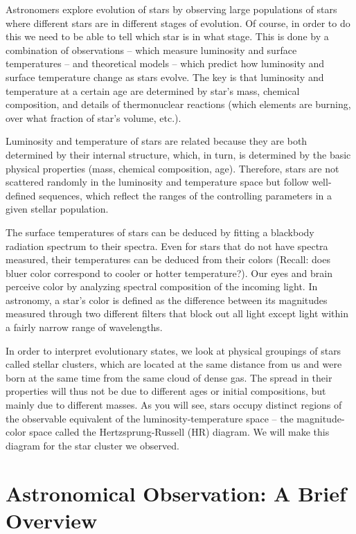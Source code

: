 Astronomers explore evolution of stars by observing large populations of stars where different stars are in different stages of evolution. Of course, in order to do this we need to be able to tell which star is in what stage. This is done by a combination of observations – which measure luminosity and surface temperatures – and theoretical models – which predict how luminosity and surface temperature change as stars evolve. The key is that luminosity and temperature at a certain age are determined by star's mass, chemical composition, and details of thermonuclear reactions (which elements are burning, over what fraction of star's volume, etc.).

Luminosity and temperature of stars are related because they are both determined by their internal structure, which, in turn, is determined by the basic physical properties (mass, chemical composition, age). Therefore, stars are not scattered randomly in the luminosity and temperature space but follow well-defined sequences, which reflect the ranges of the controlling parameters in a given stellar population. 

The surface temperatures of stars can be deduced by fitting a blackbody radiation spectrum to their spectra. Even for stars that do not have spectra measured, their temperatures can be deduced from their colors (Recall: does bluer color correspond to cooler or hotter temperature?). Our eyes and brain perceive color by analyzing spectral composition of the incoming light. In astronomy, a star's color is defined as the difference between its magnitudes measured through two different filters that block out all light except light within a fairly narrow range of wavelengths. 

In order to interpret evolutionary states, we look at physical groupings of stars called stellar clusters, which are located at the same distance from us and were born at the same time from the same cloud of dense gas. The spread in their properties will thus not be due to different ages or initial compositions, but mainly due to different masses. As you will see, stars occupy distinct regions of the observable equivalent of the luminosity-temperature space – the magnitude-color space called the Hertzsprung-Russell (HR) diagram. We will make this diagram for the star cluster we observed.

\section{Astronomical Observation: A Brief Overview}

